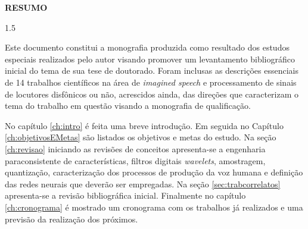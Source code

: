 \documentclass[a4paper,12pt,openright,oneside]{book}
\newenvironment{myenv}[1]
  {\begin{spacing}{#1}}
  {\end{spacing}}
\begin{document}

	\setlength{\parindent}{0pt}
	\newpage \thispagestyle{empty}
	\vspace{1.5cm}
	\fontsize{12}{\baselineskip} \selectfont

	\begin{center}
		{\huge{\textbf{RESUMO}}}
	\end{center}

	\begin{myenv}{1.5}
		\fontsize{12}{\baselineskip} \selectfont \onehalfspacing
		\par \null
		\par \null
		\par Este documento constitui a monografia produzida como resultado dos estudos especiais realizados pelo autor visando promover um levantamento bibliográfico inicial do tema de sua tese de doutorado. Foram inclusas as descrições essenciais de 14 trabalhos científicos na área de \textit{imagined speech} e processamento de sinais de locutores disfônicos ou não, acrescidos ainda, das direções que caracterizam o tema do trabalho em questão visando a monografia de qualificação.
		
		\par No capítulo \ref{ch:intro} é feita uma breve introdução. Em seguida no Capítulo \ref{ch:objetivosEMetas} são listados os objetivos e metas do estudo. Na seção \ref{ch:revisao} iniciando as revisões de conceitos apresenta-se a engenharia paraconsistente de características, filtros digitais \textit{wavelets}, amostragem, quantização, caracterização dos processos de produção da voz humana e definição das redes neurais que deverão ser empregadas. Na seção \ref{sec:trabcorrelatos} apresenta-se a revisão bibliográfica inicial. Finalmente no capítulo \ref{ch:cronograma} é mostrado um cronograma com os trabalhos já realizados e uma previsão da realização dos próximos.
		
	\end{myenv}

	\cleardoublepage
	\listoffigures
	
	\cleardoublepage
	\listoftables
	\frontmatter
	
	\def\contentsname{Sumário} 
	\tableofcontents
	\cleardoublepage
	
\end{document}
